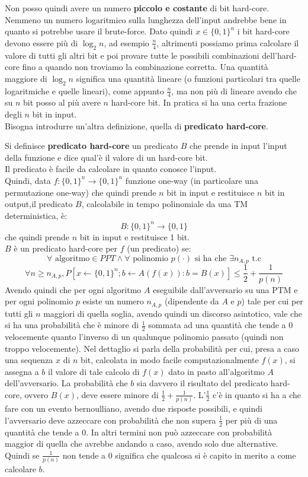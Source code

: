 \documentclass[a4paper,12pt, oneside]{book}
\begin{document}
Non posso quindi avere un numero \textbf{piccolo e costante} di bit hard-core.\\
Nemmeno un numero logaritmico sulla lunghezza dell'input andrebbe bene in
quanto si potrebbe usare il brute-force. Dato quindi $x\in\{0,1\}^n$ i bit
hard-core devono essere più di $\log_2n$, ad esempio $\frac{n}{4}$, altrimenti
possiamo prima calcolare il valore di tutti gli altri bit e poi provare tutte le
possibili combinazioni dell'hard-core fino a quando non troviamo la combinazione
corretta. Una quantità maggiore di $\log_2n$ significa una quantità lineare (o
funzioni particolari tra quelle logaritmiche e quelle lineari), come appunto
$\frac{n}{4}$, ma non più di 
lineare avendo che su $n$ bit posso al più avere $n$ hard-core bit. In pratica
si ha una certa frazione degli $n$ bit in input.\\
Bisogna introdurre un'altra definizione, quella di \textbf{predicato hard-core}.
\begin{definizione}
  Si definisce \textbf{predicato hard-core} un predicato $B$ che prende in input
  l'input della funzione e dice qual'è il valore di un hard-core bit.\\
  Il predicato è facile da calcolare in quanto conosce l'input.\\
  Quindi, data $f:\{0,1\}^n\to\{0,1\}^n$ funzione one-way (in particolare una
  permutazione one-way) che
  quindi prende $n$ bit in input e restituisce $n$ bit in output,il
  predicato $B$, calcolabile in tempo polinomiale da una TM deterministica, è: 
  \[B:\{0,1\}^n\to\{0,1\}\]
  che quindi prende $n$ bit in input e restituisce 1 bit.\\
  $B$ è un predicato hard-core per $f$ (un predicato) se:
  \[\forall \mbox{ algoritmo}\in PPT\land\forall\mbox{ polinomio }p(\cdot)
    \mbox{ si ha che }\exists n_{A,p} \mbox{ t.c}\]
  \[\forall n\geq n_{A,p},P[x\gets \{0,1\}^n ; b \gets A( f ( x)) : b = B(
    x)]\leq\frac{1}{2}+\frac{1}{p(n)}\] 
  Avendo quindi che per ogni algoritmo $A$ eseguibile dall'avversario su una PTM
  e per ogni polinomio $p$ esiste un numero $n_{A,p}$ (dipendente da $A$ e $p$)
  tale per cui per tutti gli $n$ maggiori di quella soglia, avendo quindi un
  discorso asintotico, vale che si ha una probabilità che è minore di
  $\frac{1}{2}$ sommata ad una quantità che tende a 0 velocemente quanto
  l'inverso di un qualunque polinomio passato (quindi non troppo
  velocemente). Nel dettaglio si parla della probabilità per cui, presa a caso
  una sequenza $x$ di $n$ bit, calcolata in modo facile computazionalmente
  $f(x)$, si assegna a $b$ il valore di tale calcolo di $f(x)$ dato in pasto
  all'algoritmo $A$ dell'avversario. La probabilità che $b$ sia davvero il
  risultato del predicato hard-core, ovvero $B(x)$, deve essere minore di
  $\frac{1}{2}+\frac{1}{p(n)}$. L'$\frac{1}{2}$ c'è in quanto si ha a che fare
  con un evento bernoulliano, avendo due risposte possibili, e quindi
  l'avversario deve azzeccare con probabilità che non supera $\frac{1}{2}$ per
  più di una quantità che tende a 0. In altri termini non può azzeccare con
  probabilità maggior di quella che avrebbe andando a caso, avendo solo due
  alternative. Quindi se $\frac{1}{p(n)}$ non tende a 0 significa che qualcosa
  si è capito in merito a come calcolare $b$. 
\end{definizione}
\end{document}
